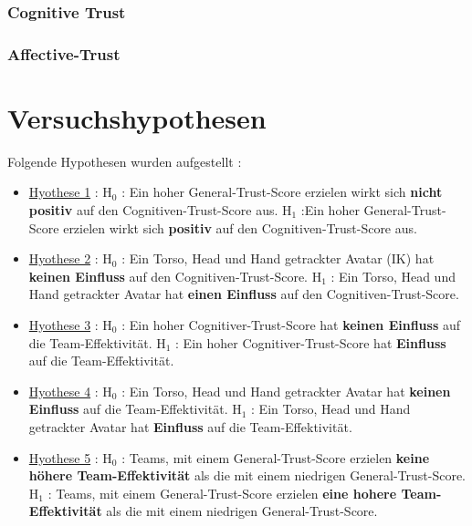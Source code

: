 \documentclass[a4paper,11pt]{article}%
\renewcommand{\\}{\vspace*{0.5\baselineskip} \newline}
\begin{document}
		\subsubsection{Cognitive Trust}
		
		\subsubsection{Affective-Trust}
		
	\newpage
	\section{Versuchshypothesen}

Folgende Hypothesen wurden aufgestellt :
\begin{itemize}
	\item{\underline{Hyothese 1} :\\ H$_{0}$ : Ein hoher General-Trust-Score erzielen wirkt sich \textbf{nicht positiv} auf den Cognitiven-Trust-Score aus. \newline
	H$_{1}$ :Ein hoher General-Trust-Score erzielen wirkt sich \textbf{positiv} auf den Cognitiven-Trust-Score aus.}
	
	\item{\underline{Hyothese 2} :\\ H$_{0}$ : Ein Torso, Head und Hand getrackter Avatar (IK) hat \textbf{keinen Einfluss} auf den Cognitiven-Trust-Score.\newline
	H$_{1}$ : Ein Torso, Head und Hand getrackter Avatar hat \textbf{einen Einfluss} auf den Cognitiven-Trust-Score.}
	
	\item{\underline{Hyothese 3} :\\ H$_{0}$ : Ein hoher Cognitiver-Trust-Score hat \textbf{keinen Einfluss} auf die Team-Effektivität. \newline
	H$_{1}$ : Ein hoher Cognitiver-Trust-Score hat \textbf{Einfluss} auf die Team-Effektivität.}
	
	\item{\underline{Hyothese 4} :\\ H$_{0}$ : Ein Torso, Head und Hand getrackter Avatar hat \textbf{keinen Einfluss} auf die Team-Effektivität. \newline
	H$_{1}$ : Ein Torso, Head und Hand getrackter Avatar hat \textbf{Einfluss} auf die Team-Effektivität.}
	
	\item{\underline{Hyothese 5} :\\ H$_{0}$ : Teams, mit einem General-Trust-Score erzielen \textbf{keine höhere Team-Effektivität} als die mit einem niedrigen General-Trust-Score. \newline
	H$_{1}$ : Teams, mit einem General-Trust-Score erzielen \textbf{eine hohere Team-Effektivität} als die mit einem niedrigen General-Trust-Score.}
\end{itemize}
\end{document}

